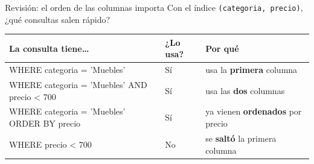 \documentclass[aspectratio=169,10pt,c]{beamer}
\newcommand{\mal}[1]{{\setlength{\fboxsep}{1.2pt}\colorbox{utpRojo!18}{#1}}}
\begin{document}
\begin{frame}{Revisión: el orden de las columnas importa}
\small Con el índice \texttt{(categoria, precio)}, ¿qué consultas salen rápido?
\vspace{0.1cm}
\begin{center}
\small
\renewcommand{\arraystretch}{1.2}
\begin{tabular}{>{\ttfamily\footnotesize\raggedright\arraybackslash}p{7.0cm}>{\centering\arraybackslash}p{1.5cm}>{\raggedright\arraybackslash}p{4.5cm}}
\toprule
\normalfont\bfseries La consulta tiene\ldots & \bfseries ¿Lo usa? & \bfseries Por qué \\
\midrule
WHERE categoria = 'Muebles' & Sí & usa la \textbf{primera} columna \\
WHERE categoria = 'Muebles' AND precio < 700 & Sí & usa las \textbf{dos} columnas \\
WHERE categoria = 'Muebles' ORDER BY precio & Sí & ya vienen \textbf{ordenados} por precio \\
WHERE precio < 700 & \mal{No} & se \textbf{saltó} la primera columna \\
\bottomrule
\end{tabular}
\end{center}
\vspace{-0.1cm}
\vspace{0.05cm}
\end{frame}
\end{document}
